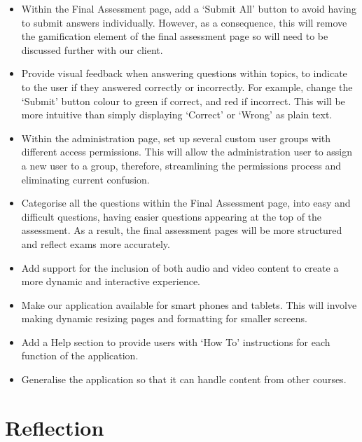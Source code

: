 \documentclass{l3proj}
\begin{document}
\begin{itemize}
\item Within the Final Assessment page, add a `Submit All' button to avoid having to submit answers individually. However, as a consequence, this will remove the gamification element of the final assessment page so will need to be discussed further with our client.
\item Provide visual feedback when answering questions within topics, to indicate to the user if they answered correctly or incorrectly. For example, change the `Submit' button colour to green if correct, and red if incorrect. This will be more intuitive than simply displaying `Correct' or `Wrong' as plain text.
\item Within the administration page, set up several custom user groups with different access permissions. This will allow the administration user to assign a new user to a group, therefore, streamlining the permissions process and eliminating current confusion.
\item Categorise all the questions within the Final Assessment page, into easy and difficult questions, having easier questions appearing at the top of the assessment. As a result, the final assessment pages will be more structured and reflect exams more accurately.
\item Add support for the inclusion of both audio and video content to create a more dynamic and interactive experience.
\item Make our application available for smart phones and tablets. This will involve making dynamic resizing pages and formatting for smaller screens.
\item Add a Help section to provide users with `How To' instructions for each function of the application.
\item Generalise the application so that it can handle content from other courses. 
\end{itemize}

\section{Reflection}


\end{document}
